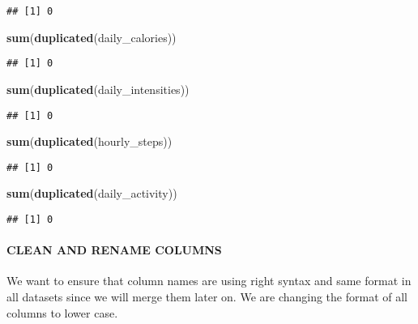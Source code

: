 \documentclass[
]{article}
\newenvironment{Shaded}{\begin{snugshade}}{\end{snugshade}}
\newcommand{\FunctionTok}[1]{\textcolor[rgb]{0.13,0.29,0.53}{\textbf{#1}}}
\newcommand{\NormalTok}[1]{#1}
\begin{document}
\begin{verbatim}
## [1] 0
\end{verbatim}

\begin{Shaded}
\begin{Highlighting}[]
\FunctionTok{sum}\NormalTok{(}\FunctionTok{duplicated}\NormalTok{(daily\_calories))}
\end{Highlighting}
\end{Shaded}

\begin{verbatim}
## [1] 0
\end{verbatim}

\begin{Shaded}
\begin{Highlighting}[]
\FunctionTok{sum}\NormalTok{(}\FunctionTok{duplicated}\NormalTok{(daily\_intensities))}
\end{Highlighting}
\end{Shaded}

\begin{verbatim}
## [1] 0
\end{verbatim}

\begin{Shaded}
\begin{Highlighting}[]
\FunctionTok{sum}\NormalTok{(}\FunctionTok{duplicated}\NormalTok{(hourly\_steps))}
\end{Highlighting}
\end{Shaded}

\begin{verbatim}
## [1] 0
\end{verbatim}

\begin{Shaded}
\begin{Highlighting}[]
\FunctionTok{sum}\NormalTok{(}\FunctionTok{duplicated}\NormalTok{(daily\_activity))}
\end{Highlighting}
\end{Shaded}

\begin{verbatim}
## [1] 0
\end{verbatim}

\hypertarget{clean-and-rename-columns}{%
\paragraph{CLEAN AND RENAME COLUMNS}\label{clean-and-rename-columns}}

We want to ensure that column names are using right syntax and same
format in all datasets since we will merge them later on. We are
changing the format of all columns to lower case.
\end{document}
